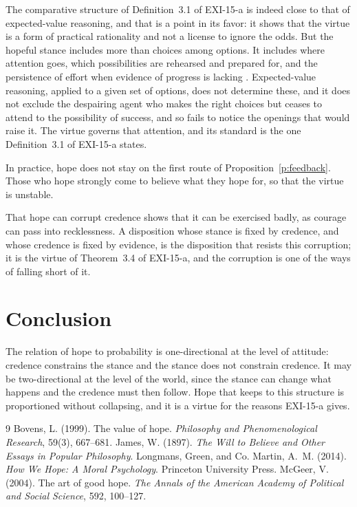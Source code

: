 \documentclass{situationist-preprint}
\begin{document}
\begin{reply}
The comparative structure of Definition~3.1 of EXI-15-a is indeed close to that of expected-value reasoning, and that is a point in its favor: it shows that the virtue is a form of practical rationality and not a license to ignore the odds. But the hopeful stance includes more than choices among options. It includes where attention goes, which possibilities are rehearsed and prepared for, and the persistence of effort when evidence of progress is lacking \citep{McGeer2004}. Expected-value reasoning, applied to a given set of options, does not determine these, and it does not exclude the despairing agent who makes the right choices but ceases to attend to the possibility of success, and so fails to notice the openings that would raise it. The virtue governs that attention, and its standard is the one Definition~3.1 of EXI-15-a states.
\end{reply}

\begin{objection}
In practice, hope does not stay on the first route of Proposition~\ref{p:feedback}. Those who hope strongly come to believe what they hope for, so that the virtue is unstable.
\end{objection}

\begin{reply}
That hope can corrupt credence shows that it can be exercised badly, as courage can pass into recklessness. A disposition whose stance is fixed by credence, and whose credence is fixed by evidence, is the disposition that resists this corruption; it is the virtue of Theorem~3.4 of EXI-15-a, and the corruption is one of the ways of falling short of it.
\end{reply}

\section{Conclusion}

The relation of hope to probability is one-directional at the level of attitude: credence constrains the stance and the stance does not constrain credence. It may be two-directional at the level of the world, since the stance can change what happens and the credence must then follow. Hope that keeps to this structure is proportioned without collapsing, and it is a virtue for the reasons EXI-15-a gives.

\begin{thebibliography}{9}\small
{} Bovens, L. (1999). The value of hope. \emph{Philosophy and Phenomenological Research}, 59(3), 667--681.
 James, W. (1897). \emph{The Will to Believe and Other Essays in Popular Philosophy}. Longmans, Green, and Co.
 Martin, A.~M. (2014). \emph{How We Hope: A Moral Psychology}. Princeton University Press.
 McGeer, V. (2004). The art of good hope. \emph{The Annals of the American Academy of Political and Social Science}, 592, 100--127.
\end{thebibliography}
\end{document}
